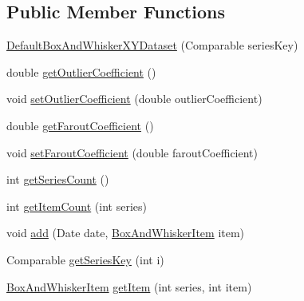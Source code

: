 \subsection*{Public Member Functions}
\begin{DoxyCompactItemize}
\item 
\mbox{\hyperlink{classorg_1_1jfree_1_1data_1_1statistics_1_1_default_box_and_whisker_x_y_dataset_a31f9a719fa9aab91a976f9724d5ce30e}{Default\+Box\+And\+Whisker\+X\+Y\+Dataset}} (Comparable series\+Key)
\item 
double \mbox{\hyperlink{classorg_1_1jfree_1_1data_1_1statistics_1_1_default_box_and_whisker_x_y_dataset_ac47213bfcf3d3a0069a096077ea77531}{get\+Outlier\+Coefficient}} ()
\item 
void \mbox{\hyperlink{classorg_1_1jfree_1_1data_1_1statistics_1_1_default_box_and_whisker_x_y_dataset_afa20bd58ffbcf073b4aadf19b08d52e1}{set\+Outlier\+Coefficient}} (double outlier\+Coefficient)
\item 
double \mbox{\hyperlink{classorg_1_1jfree_1_1data_1_1statistics_1_1_default_box_and_whisker_x_y_dataset_a0e7767b34470a4bb8b74de4c3646e1a9}{get\+Farout\+Coefficient}} ()
\item 
void \mbox{\hyperlink{classorg_1_1jfree_1_1data_1_1statistics_1_1_default_box_and_whisker_x_y_dataset_ad09efbf58cbebab01356d33631e5f578}{set\+Farout\+Coefficient}} (double farout\+Coefficient)
\item 
int \mbox{\hyperlink{classorg_1_1jfree_1_1data_1_1statistics_1_1_default_box_and_whisker_x_y_dataset_acfef7ad3244f539fec7239f4b9b5a397}{get\+Series\+Count}} ()
\item 
int \mbox{\hyperlink{classorg_1_1jfree_1_1data_1_1statistics_1_1_default_box_and_whisker_x_y_dataset_a406199d4c7353865851ff20ec3523d28}{get\+Item\+Count}} (int series)
\item 
void \mbox{\hyperlink{classorg_1_1jfree_1_1data_1_1statistics_1_1_default_box_and_whisker_x_y_dataset_a14130718ba2ad78bb9273684877f8e8c}{add}} (Date date, \mbox{\hyperlink{classorg_1_1jfree_1_1data_1_1statistics_1_1_box_and_whisker_item}{Box\+And\+Whisker\+Item}} item)
\item 
Comparable \mbox{\hyperlink{classorg_1_1jfree_1_1data_1_1statistics_1_1_default_box_and_whisker_x_y_dataset_a2b2ce173b44011ab95a798047f997432}{get\+Series\+Key}} (int i)
\item 
\mbox{\hyperlink{classorg_1_1jfree_1_1data_1_1statistics_1_1_box_and_whisker_item}{Box\+And\+Whisker\+Item}} \mbox{\hyperlink{classorg_1_1jfree_1_1data_1_1statistics_1_1_default_box_and_whisker_x_y_dataset_aafcec2d9efdb0f88cda119a40505c76d}{get\+Item}} (int series, int item)

\end{DoxyCompactItemize}
